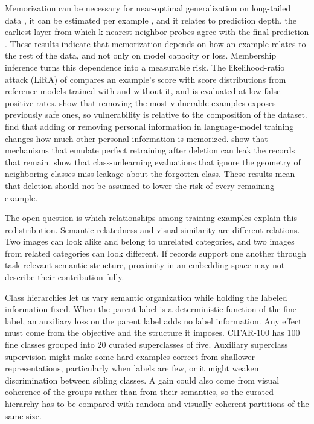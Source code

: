 \documentclass{article} %
\begin{document}
Memorization can be necessary for near-optimal generalization on long-tailed data \citep{feldman2020memorization}, it can be estimated per example \citep{feldman2020neural}, and it relates to prediction depth, the earliest layer from which k-nearest-neighbor probes agree with the final prediction \citep{baldock2021difficulty}. These results indicate that memorization depends on how an example relates to the rest of the data, and not only on model capacity or loss. Membership inference turns this dependence into a measurable risk. The likelihood-ratio attack (LiRA) of \citet{carlini2022lira} compares an example's score with score distributions from reference models trained with and without it, and is evaluated at low false-positive rates. \citet{carlini2022onion} show that removing the most vulnerable examples exposes previously safe ones, so vulnerability is relative to the composition of the dataset. \citet{borkar2025ripple} find that adding or removing personal information in language-model training changes how much other personal information is memorized. \citet{cohen2026undeleted} show that mechanisms that emulate perfect retraining after deletion can leak the records that remain. \citet{ebrahimpour2026class} show that class-unlearning evaluations that ignore the geometry of neighboring classes miss leakage about the forgotten class. These results mean that deletion should not be assumed to lower the risk of every remaining example.

The open question is which relationships among training examples explain this redistribution. Semantic relatedness and visual similarity are different relations. Two images can look alike and belong to unrelated categories, and two images from related categories can look different. If records support one another through task-relevant semantic structure, proximity in an embedding space may not describe their contribution fully.

Class hierarchies let us vary semantic organization while holding the labeled information fixed. When the parent label is a deterministic function of the fine label, an auxiliary loss on the parent label adds no label information. Any effect must come from the objective and the structure it imposes. CIFAR-100 \citep{krizhevsky2009cifar} has 100 fine classes grouped into 20 curated superclasses of five. Auxiliary superclass supervision might make some hard examples correct from shallower representations, particularly when labels are few, or it might weaken discrimination between sibling classes. A gain could also come from visual coherence of the groups rather than from their semantics, so the curated hierarchy has to be compared with random and visually coherent partitions of the same size.
\end{document}
